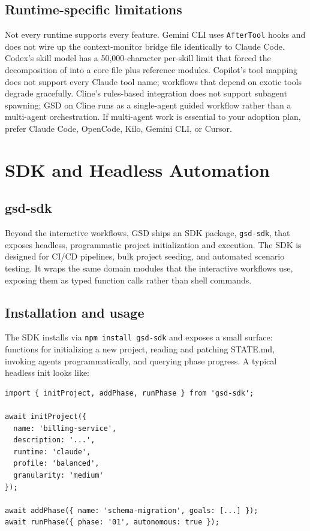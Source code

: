 \documentclass[11pt,letterpaper,openany]{book}
\begin{document}
\section{Runtime-specific limitations}

Not every runtime supports every feature. Gemini CLI uses \texttt{AfterTool} hooks and does not wire up the context-monitor bridge file identically to Claude Code. Codex's skill model has a 50{,}000-character per-skill limit that forced the decomposition of  into a core file plus reference modules. Copilot's tool mapping does not support every Claude tool name; workflows that depend on exotic tools degrade gracefully. Cline's rules-based integration does not support subagent spawning; GSD on Cline runs as a single-agent guided workflow rather than a multi-agent orchestration. If multi-agent work is essential to your adoption plan, prefer Claude Code, OpenCode, Kilo, Gemini CLI, or Cursor.

\chapter{SDK and Headless Automation}

\section{gsd-sdk}

Beyond the interactive workflows, GSD ships an SDK package, \texttt{gsd-sdk}, that exposes headless, programmatic project initialization and execution. The SDK is designed for CI/CD pipelines, bulk project seeding, and automated scenario testing. It wraps the same  domain modules that the interactive workflows use, exposing them as typed function calls rather than shell commands.

\section{Installation and usage}

The SDK installs via \texttt{npm install gsd-sdk} and exposes a small surface: functions for initializing a new project, reading and patching STATE.md, invoking agents programmatically, and querying phase progress. A typical headless init looks like:

\begin{lstlisting}
import { initProject, addPhase, runPhase } from 'gsd-sdk';

await initProject({
  name: 'billing-service',
  description: '...',
  runtime: 'claude',
  profile: 'balanced',
  granularity: 'medium'
});

await addPhase({ name: 'schema-migration', goals: [...] });
await runPhase({ phase: '01', autonomous: true });
\end{lstlisting}
\end{document}
